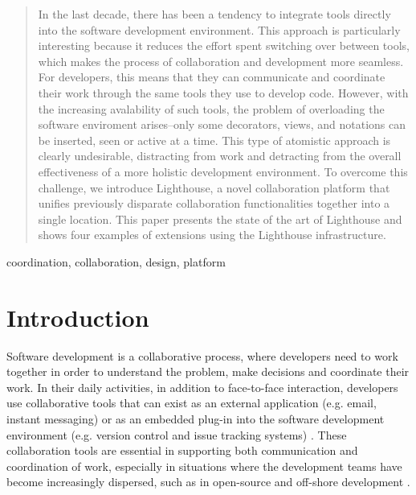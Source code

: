 \documentclass[10pt, conference, compsocconf]{IEEEtran}
\begin{document}




\maketitle


\begin{abstract}
In the last decade, there has been a tendency to integrate tools directly into
the software development environment. This approach is particularly
interesting because it reduces the effort spent switching over between tools,
which makes the process of collaboration and development more seamless. For developers, this means that they can communicate and coordinate their work through the same tools they use to develop code. However, with the increasing
avalability of such tools, the problem of overloading the software enviroment
arises--only some decorators, views, and notations can be inserted, seen or 
active at a time. This type of atomistic approach is clearly undesirable, 
distracting from work and detracting from the overall effectiveness of a more 
holistic development environment. To overcome this challenge, we introduce 
Lighthouse, a novel collaboration platform that unifies previously 
disparate collaboration functionalities together into a single location. 
This paper presents the state of the art of Lighthouse and shows four examples 
of extensions using the Lighthouse infrastructure.
\end{abstract}

\begin{IEEEkeywords}
coordination, collaboration, design, platform
\end{IEEEkeywords}


%
\IEEEpeerreviewmaketitle



\section{Introduction}
Software development is a collaborative process, where developers need to work together in order to understand the problem, make decisions and coordinate their work. In their daily activities, in addition to face-to-face interaction, developers use collaborative tools that can exist as an external application (e.g. email, instant messaging) or as an embedded plug-in into the software development environment (e.g. version control and issue tracking systems) \cite{Cheng:2003}. These collaboration tools are essential in supporting both communication and coordination of work, especially in situations where the development teams have become increasingly dispersed, such as in open-source and off-shore development \cite{Cheng:2003}.
\end{document}

